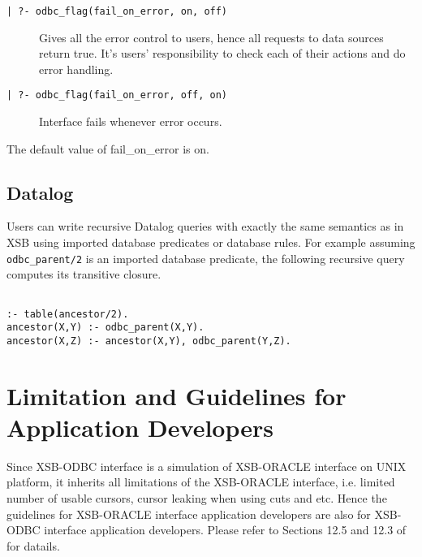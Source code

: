 \begin{description}

\item[\tt | ?- odbc\_flag(fail\_on\_error, on, off)] Gives all the error control 
to users, hence all requests to data sources return true.  It's users' 
responsibility to check each of their actions and do error handling.

\item[\tt | ?- odbc\_flag(fail\_on\_error, off, on)] Interface fails whenever 
error occurs.
\end{description}

The default value of fail\_on\_error is on.


\subsection{Datalog}
Users can write recursive Datalog queries with exactly the same
semantics as in XSB using imported database predicates or database
rules.  For example assuming {\tt odbc\_parent/2} is an imported database
predicate, the following recursive query computes its transitive closure.

\begin{verbatim}

:- table(ancestor/2).
ancestor(X,Y) :- odbc_parent(X,Y).
ancestor(X,Z) :- ancestor(X,Y), odbc_parent(Y,Z).
\end{verbatim}


\section{Limitation and Guidelines for Application Developers} \label{Guide}
Since XSB-ODBC interface is a simulation of XSB-ORACLE interface on UNIX 
platform, it inherits all limitations of the XSB-ORACLE interface, i.e. limited 
number of usable cursors, cursor leaking when using cuts and etc.  Hence 
the guidelines for XSB-ORACLE interface application 
developers are also for XSB-ODBC interface application developers.  
Please refer to Sections 12.5 and 12.3 of \cite{xsb-manual} for datails.

